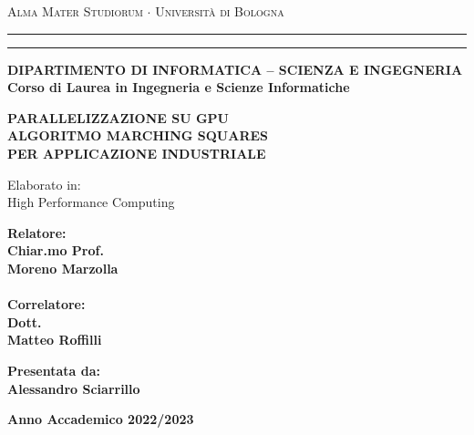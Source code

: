 \documentclass[12pt,a4paper]{report}
\begin{document}
\begin{titlepage}
\begin{center}
{{\Large{\textsc{Alma Mater Studiorum $\cdot$ Universit\`a di
Bologna}}}} \rule[0.1cm]{15.8cm}{0.1mm}
\rule[0.5cm]{15.8cm}{0.6mm}
{\small{\bf DIPARTIMENTO DI INFORMATICA – SCIENZA E INGEGNERIA\\
Corso di Laurea in Ingegneria e Scienze Informatiche }}
\end{center}
\vspace{15mm}
\begin{center}
{\LARGE{\bf PARALLELIZZAZIONE SU GPU}}\\
\vspace{3mm}
{\LARGE{\bf ALGORITMO MARCHING SQUARES}}\\
\vspace{3mm}
{\LARGE{\bf PER APPLICAZIONE INDUSTRIALE}}\\
\vspace{25mm}

Elaborato in:\\
High Performance Computing\\
\end{center}
\vspace{25mm}
\par
\noindent
\begin{minipage}[t]{0.47\textwidth}
{\large{\bf Relatore:\\
Chiar.mo Prof.\\
Moreno Marzolla\\}}
{\large{\bf \\Correlatore:\\
Dott.\\
Matteo Roffilli}}
\end{minipage}
\hfill
\begin{minipage}[t]{0.47\textwidth}\raggedleft
{\large{\bf Presentata da:\\
Alessandro Sciarrillo}}
\end{minipage}
\vspace{30mm}
\begin{center}
{\large{\bf 
Anno Accademico 2022/2023}}%
\end{center}
\end{titlepage}


\hypersetup{
    allcolors=black
}
\tableofcontents
\end{document}
